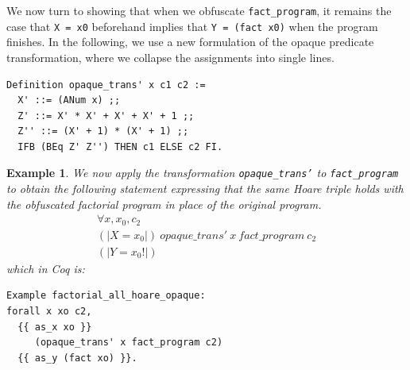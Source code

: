 \documentclass[compsoc,conference,a4paper,10pt,times]{IEEEtran}
\newtheorem{example}[theorem]{Example}
\begin{document}
We now turn to showing that when we obfuscate \texttt{fact\_program}, it remains the case that \texttt{X = x0} beforehand implies that \texttt{Y = (fact x0)} when the program finishes.
In the following, we use a new formulation of the opaque predicate transformation, where we collapse the assignments into single lines.
\begin{verbatim}
Definition opaque_trans' x c1 c2 :=
  X' ::= (ANum x) ;;
  Z' ::= X' * X' + X' + X' + 1 ;;
  Z'' ::= (X' + 1) * (X' + 1) ;;
  IFB (BEq Z' Z'') THEN c1 ELSE c2 FI.
\end{verbatim}

\begin{example}\label{hoarel2}
    We now apply the transformation \texttt{opaque\_trans'} to \texttt{fact\_program} to obtain the following statement expressing that the same Hoare triple holds with the obfuscated factorial program in place of the original program.
    \[
    \begin{array}{l}
    \forall x, x_0, c_2\\
    (|X=x_0|)\ opaque\_trans'\ x\ fact\_program\ c_2\\ (|Y=x_0!|)
    \end{array}
    \]
    which in Coq is:
\begin{verbatim}
Example factorial_all_hoare_opaque: 
forall x xo c2,
  {{ as_x xo }} 
     (opaque_trans' x fact_program c2) 
  {{ as_y (fact xo) }}.
\end{verbatim}
\end{example}
\end{document}
